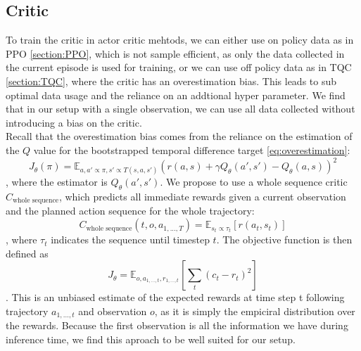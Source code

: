 \subsection{Critic}
\label{sec:AC_Critic}
To train the critic in actor critic mehtods, we can either use on policy data as in PPO \ref{section:PPO}, which is not sample efficient, as only the data collected 
in the current episode is used for training, or we can use off policy data as in TQC \ref{section:TQC}, where the critic has an overestimation bias. This 
leads to sub optimal data usage and the reliance on an addtional hyper parameter. We find that in our setup with a single observation, we can use all data 
collected without introducing a bias on the critic. \\
Recall that the overestimation bias comes from the reliance on the estimation of the $Q$ value for the bootstrapped temporal difference target \ref{eq:overestimation}:
\begin{equation}
    \label{eq:TD_Methodology}
    J_{\theta}(\pi) = \mathbb{E}_{a,a' \propto \pi, s' \propto T(s,a,s')}(r(a,s) + \gamma Q_\theta(a', s') - Q_\theta(a,s))^2
\end{equation}
, where the estimator is $Q_\theta(a', s')$. We propose to use a whole sequence critic $C_{\text{whole sequence}}$, which predicts all immediate rewards given a current observation 
and the planned action sequence for the whole trajectory:
\begin{equation}
    C_{\text{whole sequence}}(t, o, a_{1, ..., T}) = \mathbb{E}_{s_t \propto \tau_t}\left[r(a_t, s_t)\right]
\end{equation}
, where $\tau_t$ indicates the sequence until timestep $t$. 
The objective function is then defined as 
\begin{equation}
    J_\theta = \mathbb{E}_{o, a_{1, ..., t}, r_{1, ..., t}}\left[\sum_t(c_t - r_t)^2\right]
\end{equation}
. This is an unbiased estimate of the expected rewards at time step t following trajectory $a_{1, ..., t}$ and observation $o$, as it is simply the empiciral distribution 
over the rewards. Because the 
first observation is all the information we have during inference time, we find this aproach to be well suited for our setup.\\

